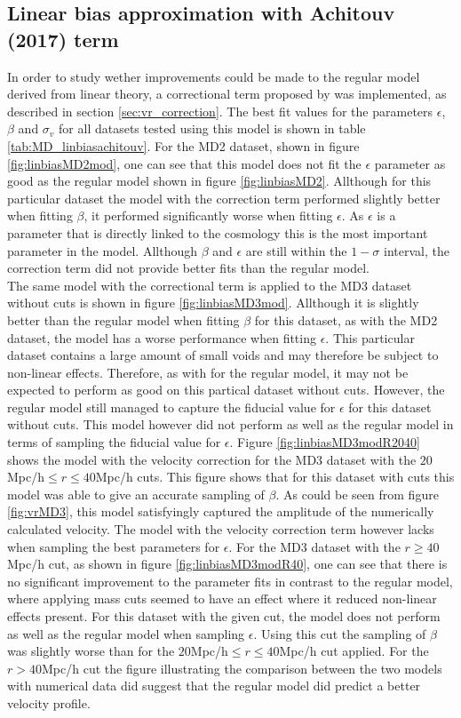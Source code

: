 \subsection{Linear bias approximation with Achitouv (2017) term}
In order to study wether improvements could be made to the regular model derived from linear theory, a correctional term proposed by \cite{Achitouv_streaming} was implemented, as described in section \ref{sec:vr_correction}. The best fit values for the parameters $\epsilon$, $\beta$ and $\sigma_v$ for all datasets tested using this model is shown in table \ref{tab:MD_linbiasachitouv}. For the MD2 dataset, shown in figure \ref{fig:linbiasMD2mod}, one can see that this model does not fit the $\epsilon$ parameter as good as the regular model shown in figure \ref{fig:linbiasMD2}. Allthough for this particular dataset the model with the correction term performed slightly better when fitting $\beta$, it performed significantly worse when fitting $\epsilon$. As $\epsilon$ is a  parameter that is directly linked to the cosmology this is the most important parameter in the model. Allthough $\beta$ and $\epsilon$ are still within the $1-\sigma$ interval, the correction term did not provide better fits than the regular model.\\\indent
The same model with the correctional term is applied to the MD3 dataset without cuts is shown in figure \ref{fig:linbiasMD3mod}. Allthough it is slightly better than the regular model when fitting $\beta$ for this dataset, as with the MD2 dataset, the model has a worse performance when fitting $\epsilon$. This particular dataset contains a large amount of small voids and may therefore be subject to non-linear effects. Therefore, as with for the regular model, it may not be expected to perform as good on this partical dataset without cuts. However, the regular model still managed to 
capture the fiducial value for $\epsilon$ for this dataset without cuts. This model however did not perform as well as the regular model in terms of sampling the fiducial value for $\epsilon$.
Figure \ref{fig:linbiasMD3modR2040} shows the model with the velocity correction for the MD3 dataset with the $20$Mpc/h$\leq r\leq 40$Mpc/h cuts. This figure shows that for this dataset with cuts this model was able to give an accurate sampling of $\beta$. As could be seen from figure \ref{fig:vrMD3}, this model satisfyingly captured the amplitude of the numerically calculated velocity. The model with the velocity correction term however lacks when sampling the best parameters for $\epsilon$. For the MD3 dataset with the $r \geq 40$Mpc/h cut, as shown in figure \ref{fig:linbiasMD3modR40}, one can see that there is no significant improvement to the parameter fits in contrast to the regular model, where applying mass cuts seemed to have an effect where it reduced non-linear effects present. For this dataset with the given cut, the model does not perform as well as the regular model when sampling $\epsilon$. Using this cut the sampling of $\beta$ was slightly worse than for the $20$Mpc/h$\leq r\leq 40$Mpc/h cut applied. For the $r>40$Mpc/h cut the figure illustrating the comparison between the two models with numerical data did suggest that the regular model did predict a better velocity profile.\\\indent

